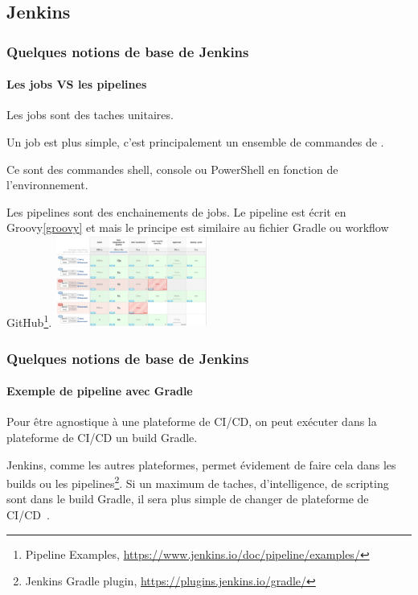 \documentclass{beamer}
\begin{document}
    \subsection{Jenkins}\label{subsec:jenkins}
    \begin{frame}
        \frametitle{Quelques notions de base de Jenkins}
        \framesubtitle{Les jobs VS les pipelines}
        \transdissolve
        Les jobs sont des taches unitaires.

        Un job est plus simple, c'est principalement un ensemble de commandes de .

        Ce sont des commandes shell, console ou PowerShell en fonction de l'environnement.

        \bigbreak
        Les pipelines sont des enchainements de jobs.
        Le pipeline est écrit en Groovy\cref{groovy} et mais le principe est similaire au fichier Gradle ou workflow GitHub\footnote{Pipeline Examples, \url{https://www.jenkins.io/doc/pipeline/examples/}}.
        \bigbreak
        \centering
        \includegraphics[width=5cm]{image/jenkins-pipeline.png}
    \end{frame}

    \begin{frame}
        \frametitle{Quelques notions de base de Jenkins}
        \framesubtitle{Exemple de pipeline avec Gradle}
        \transdissolve
        Pour être agnostique à une plateforme de CI/CD, on peut exécuter dans la plateforme de CI/CD un build Gradle.

        Jenkins, comme les autres plateformes, permet évidement de faire cela dans les builds ou les pipelines\footnote{Jenkins Gradle plugin, \url{https://plugins.jenkins.io/gradle/}}.
        \bigbreak
        Si un maximum de taches, d'intelligence, de scripting sont dans le build Gradle, il sera plus simple de changer de plateforme de CI/CD~.
    \end{frame}
\end{document}
